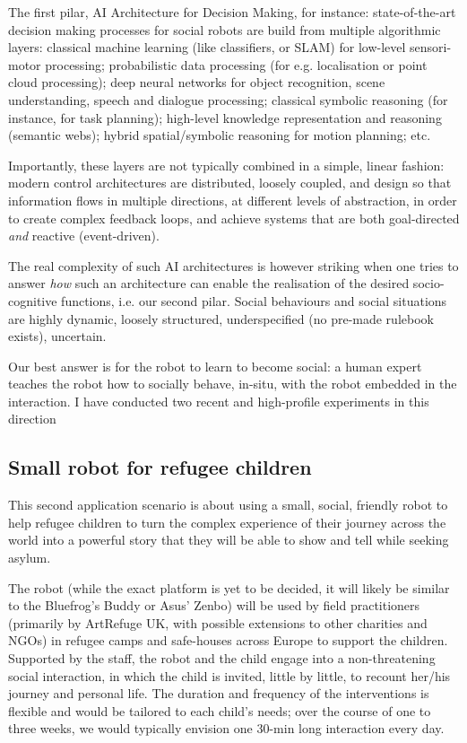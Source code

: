 \documentclass[11pt]{report}
\begin{document}
The first pilar, AI Architecture for Decision Making, for instance:
state-of-the-art decision making processes for social robots are build from
multiple algorithmic layers: classical machine learning (like classifiers, or
SLAM) for low-level sensori-motor processing; probabilistic data processing (for
e.g. localisation or point cloud processing); deep neural networks for object
recognition, scene understanding, speech and dialogue processing; classical
symbolic reasoning (for instance, for task planning); high-level knowledge
representation and reasoning (semantic webs); hybrid spatial/symbolic reasoning
for motion planning; etc.

Importantly, these layers are not typically combined in a simple, linear
fashion: modern control architectures are distributed, loosely coupled, and
design so that information flows in multiple directions, at different levels of
abstraction, in order to create complex feedback loops, and achieve systems that are
both goal-directed \emph{and} reactive (event-driven).


The real complexity of such AI architectures is however striking when one tries
to answer \emph{how} such an architecture can enable the realisation of the
desired socio-cognitive functions, i.e. our second pilar. Social behaviours and
social situations are highly dynamic, loosely structured, underspecified (no
pre-made rulebook exists), uncertain.

Our best answer is for the robot to learn to become social: a human expert teaches
the robot how to socially behave, in-situ, with the robot embedded in the
interaction. I have conducted two recent and high-profile experiments in this
direction

\subsection{Small robot for refugee children}
This second application scenario is about using a small, social, friendly robot
to help refugee children to turn the complex experience of their journey across
the world into a powerful story that they will be able to show and tell while
seeking asylum.

The robot (while the exact platform is yet to be decided, it will likely be
similar to the Bluefrog's Buddy or Asus' Zenbo) will be used by field
practitioners (primarily by ArtRefuge UK, with possible extensions to other
charities and NGOs) in refugee camps and safe-houses across Europe to support
the children. Supported by the staff, the robot and the child engage into a
non-threatening social interaction, in which the child is invited, little by
little, to recount her/his journey and personal life. The duration and frequency
of the interventions is flexible and would be tailored to each child's needs;
over the course of one to three weeks, we would typically envision one 30-min
long interaction every day.
\end{document}
